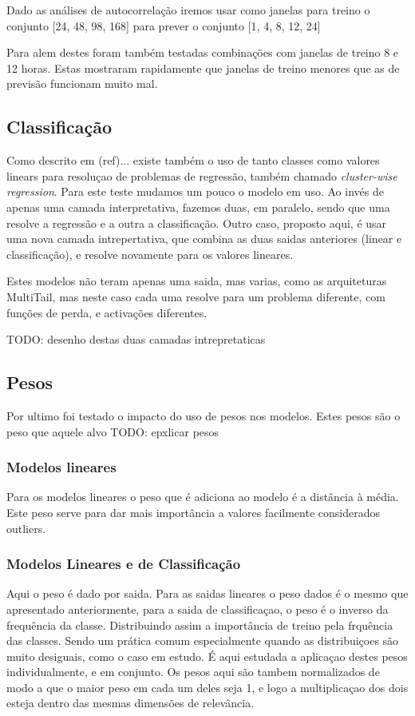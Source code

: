 Dado as análises de autocorrelação iremos usar como janelas para treino o conjunto [24, 48, 98, 168] para prever o conjunto [1, 4, 8, 12, 24]


Para alem destes foram também testadas combinações com janelas de treino 8 e 12 horas. Estas mostraram rapidamente que janelas de treino menores que as de previsão funcionam muito mal.

\subsection{Classificação}

Como descrito em (ref)... existe também o uso de tanto classes como valores linears para resoluçao de problemas de regressão, também chamado \textit{cluster-wise regression}.
Para este teste mudamos um pouco o modelo em uso. Ao invés de apenas uma camada interpretativa, fazemos duas, em paralelo, sendo que uma resolve a regressão e a outra a classificação.
Outro caso, proposto aqui, é usar uma nova camada intrepertativa, que combina as duas saidas anteriores (linear e classificação), e resolve novamente para os valores lineares.

Estes modelos não teram apenas uma saida, mas varias, como as arquiteturas MultiTail, mas neste caso cada uma resolve para um problema diferente, com funções de perda, e activações diferentes.

TODO: desenho destas duas camadas intrepretaticas

\subsection{Pesos}

Por ultimo foi testado o impacto do uso de pesos nos modelos. Estes pesos são o peso que aquele alvo TODO: epxlicar pesos

\subsubsection{Modelos lineares}

Para os modelos lineares o peso que é adiciona ao modelo é a distância à média.
Este peso serve para dar mais importância a valores facilmente considerados outliers.



\subsubsection{Modelos Lineares e de Classificação}
Aqui o peso é dado por saida. Para as saidas lineares o peso dados é o mesmo que apresentado anteriormente, para a saida de classificaçao, o peso é o inverso da frequência da classe.
Distribuindo assim a importância de treino pela frquência das classes. Sendo um prática comum especialmente quando as distribuiçoes são muito desiguais, como o caso em estudo.
É aqui estudada a aplicaçao destes pesos individualmente, e em conjunto. 
Os pesos aqui são tambem normalizados de modo a que o maior peso em cada um deles seja 1, e logo a multiplicaçao dos dois esteja dentro das mesmas dimensões de relevância.


